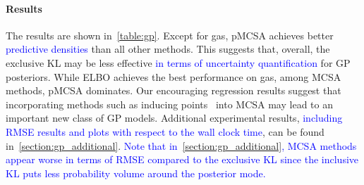 \vspace{-1.8ex}
\paragraph{Results}
The results are shown in~\cref{table:gp}.
Except for \textsf{gas}, pMCSA achieves better \textcolor{blue}{predictive densities} than all other methods.
This suggests that, overall, the exclusive KL may be less effective \textcolor{blue}{in terms of uncertainty quantification} for GP posteriors.
While ELBO achieves the best performance on \textsf{gas}, among MCSA methods, pMCSA dominates.
Our encouraging regression results suggest that incorporating methods such as inducing points~\citep{NIPS2005_4491777b} into MCSA may lead to an important new class of GP models.
Additional experimental results, \textcolor{blue}{including RMSE results and plots with respect to the wall clock time}, can be found in~\cref{section:gp_additional}.
\textcolor{blue}{
Note that in~\cref{section:gp_additional}, MCSA methods appear worse in terms of RMSE compared to the exclusive KL since the inclusive KL puts less probability volume around the posterior mode.
}


